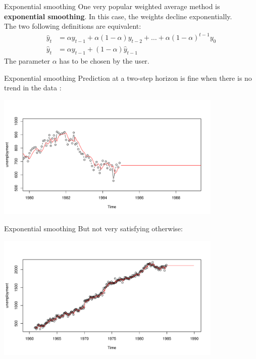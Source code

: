 \documentclass{beamer}
\begin{document}
\begin{frame}{Exponential smoothing}
One very popular weighted average method is \textbf{exponential smoothing}. In this case, the weights decline exponentially. \\
\vspace{5mm}
The two following definitions are equivalent:
\begin{equation*}
\begin{split}
\hat{y}_t & = \alpha y_{t-1} + \alpha(1-\alpha) y_{t-2} + \dots + \alpha(1-\alpha)^{t-1} y_{0} \\
\hat{y}_t & = \alpha y_{t-1} + (1-\alpha) \hat{y}_{t-1}
\end{split}	
\end{equation*}
The parameter $\alpha$ has to be chosen by the user.
\end{frame}

\begin{frame}{Exponential smoothing}
Prediction at a two-step horizon is fine when there is no trend in the data :
\begin{center}
\includegraphics[height=6cm]{figures/R/SESpred}
\end{center}
\end{frame}

\begin{frame}{Exponential smoothing}
But not very satisfying otherwise:
\begin{center}
\includegraphics[height=6cm]{figures/R/SESpredtrend}
\end{center}
\end{frame}
\end{document}
